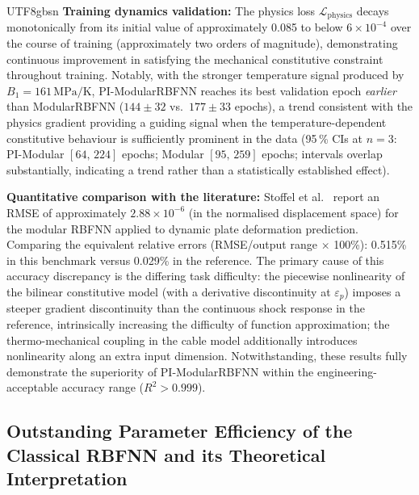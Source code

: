 \documentclass[a4paper,12pt]{report}
\newcommand{\Lphys}{\mathcal{L}_{\text{physics}}}
\begin{document}
\begin{CJK}{UTF8}{gbsn}
\textbf{Training dynamics validation:} The physics loss $\Lphys$ decays monotonically
from its initial value of approximately 0.085 to below $6 \times 10^{-4}$ over the
course of training (approximately two orders of magnitude), demonstrating continuous
improvement in satisfying the mechanical constitutive constraint throughout training.
Notably, with the stronger temperature signal produced by $B_1 = 161\,\mathrm{MPa/K}$,
PI-ModularRBFNN reaches its best validation epoch \emph{earlier} than ModularRBFNN
($144 \pm 32$ vs.\ $177 \pm 33$ epochs), a trend consistent with the physics gradient
providing a guiding signal when the temperature-dependent constitutive behaviour is
sufficiently prominent in the data (95\,\% CIs at $n{=}3$: PI-Modular $[64,\,224]$ epochs; Modular $[95,\,259]$ epochs; intervals overlap substantially, indicating a trend rather than a statistically established effect).

\textbf{Quantitative comparison with the literature:} Stoffel et al.~\cite{stoffel2020}
report an RMSE of approximately $2.88 \times 10^{-6}$ (in the normalised displacement
space) for the modular RBFNN applied to dynamic plate deformation prediction. Comparing
the equivalent relative errors (RMSE/output range $\times$ 100\%): 0.515\% in this benchmark versus 0.029\% in the reference. The primary cause of this accuracy discrepancy is
the differing task difficulty: the piecewise nonlinearity of the bilinear constitutive
model (with a derivative discontinuity at $\varepsilon_p$) imposes a steeper gradient
discontinuity than the continuous shock response in the reference, intrinsically
increasing the difficulty of function approximation; the thermo-mechanical coupling in the cable model additionally introduces nonlinearity along an extra input dimension.
Notwithstanding, these results fully demonstrate the superiority of
PI-ModularRBFNN within the engineering-acceptable accuracy range ($R^2 > 0.999$).

\subsection{Outstanding Parameter Efficiency of the Classical RBFNN and its Theoretical Interpretation}
\label{subsec:rbfnn_analysis}


\end{CJK}
\end{document}
